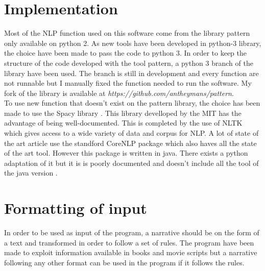 \documentclass[a4paper, 12pt]{report}
\begin{document}
\section{Implementation}

Most of the NLP function used on this software come from the library pattern \citep{pattern} only available on python 2. As new tools have been developed in python-3 library, the choice have been made to pass the code to python 3. 
In order to keep the structure of the code developed with the tool pattern, a python 3 branch of the library have been used. The branch is still in development and every function are not runnable but I manually fixed the function needed to run the software.  My fork of the library is available at \textit{https://github.com/antheymans/pattern}.\\

To use new function that doesn't exist on the pattern library, the choice has been made to use the Spacy library \citep{spacy}. This library develloped by the MIT has the advantage of being well-documented. This is completed by the use of NLTK \citep{NLTK} which gives access to a wide variety of data and corpus for NLP.  A lot of state of the art article use the standford CoreNLP package \citep{CoreNLP} which also haves all the state of the art tool. However this package is written in java. There exists a python adaptation of it but it is is poorly documented and doesn't include all the tool of the java version \citep{CoreNLPPython}.\\


\section{Formatting of input}
In order to be used as input of the program, a narrative should be on the form of a text and  transformed in order to follow a set of rules. The program have been made to exploit information available in books and movie scripts but a narrative following any other format can be used in the program if it follows the rules.
\end{document}
